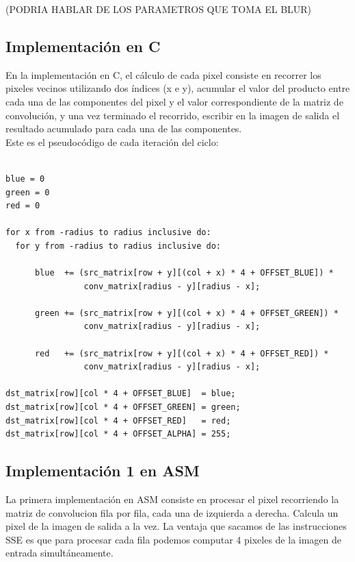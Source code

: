\documentclass[10pt,a4paper,spanish]{article}
\begin{document}
(PODRIA HABLAR DE LOS PARAMETROS QUE TOMA EL BLUR)

\subsection{Implementación en C}

En la implementación en C, el cálculo de cada pixel consiste en recorrer los pixeles vecinos utilizando dos índices (x e y), acumular el valor del producto entre cada una de las componentes del pixel y el valor correspondiente de la matriz de convolución, y una vez terminado el recorrido, escribir en la imagen de salida el resultado acumulado para cada una de las componentes. \\

Este es el pseudocódigo de cada iteración del ciclo:

\begin{codesnippet}
\begin{verbatim}

blue = 0
green = 0
red = 0

for x from -radius to radius inclusive do:
  for y from -radius to radius inclusive do:

      blue  += (src_matrix[row + y][(col + x) * 4 + OFFSET_BLUE]) *
                conv_matrix[radius - y][radius - x];

      green += (src_matrix[row + y][(col + x) * 4 + OFFSET_GREEN]) *
                conv_matrix[radius - y][radius - x];

      red   += (src_matrix[row + y][(col + x) * 4 + OFFSET_RED]) *
                conv_matrix[radius - y][radius - x];

dst_matrix[row][col * 4 + OFFSET_BLUE]  = blue;
dst_matrix[row][col * 4 + OFFSET_GREEN] = green;
dst_matrix[row][col * 4 + OFFSET_RED]   = red;
dst_matrix[row][col * 4 + OFFSET_ALPHA] = 255;

\end{verbatim}
\end{codesnippet}

\subsection{Implementación 1 en ASM}

La primera implementación en ASM consiste en procesar el pixel recorriendo la matriz de convolucion fila por fila, cada una de izquierda a derecha.
Calcula un pixel de la imagen de salida a la vez. La ventaja que sacamos de las instrucciones SSE es que para procesar cada fila podemos computar 4 pixeles de la imagen de entrada simultáneamente. \\
\end{document}
